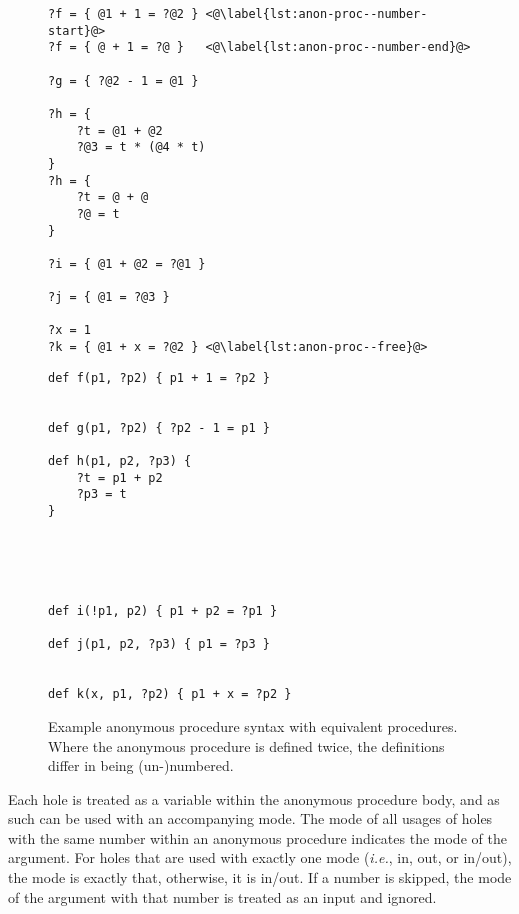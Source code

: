 \begin{figure}[ht]
  \centering
  \begin{minipage}[t]{.48\textwidth}
    \begin{lstlisting}
?f = { @1 + 1 = ?@2 } <@\label{lst:anon-proc--number-start}@>
?f = { @ + 1 = ?@ }   <@\label{lst:anon-proc--number-end}@>

?g = { ?@2 - 1 = @1 }

?h = { 
    ?t = @1 + @2
    ?@3 = t * (@4 * t)
}
?h = { 
    ?t = @ + @
    ?@ = t
}

?i = { @1 + @2 = ?@1 }

?j = { @1 = ?@3 }

?x = 1
?k = { @1 + x = ?@2 } <@\label{lst:anon-proc--free}@>
\end{lstlisting}
  \end{minipage}\hfill
  \begin{minipage}[t]{.48\textwidth}
    \begin{lstlisting}[numbers=none]
def f(p1, ?p2) { p1 + 1 = ?p2 } 


def g(p1, ?p2) { ?p2 - 1 = p1 }

def h(p1, p2, ?p3) { 
    ?t = p1 + p2
    ?p3 = t
}





def i(!p1, p2) { p1 + p2 = ?p1 }

def j(p1, p2, ?p3) { p1 = ?p3 }


def k(x, p1, ?p2) { p1 + x = ?p2 }
\end{lstlisting}
  \end{minipage}
  \caption[Example anonymous procedure syntax with equivalent procedures.]{Example anonymous procedure syntax with equivalent procedures. Where the anonymous procedure is defined twice, the definitions differ in being (un-)numbered.}
  \label{lst:anon-proc}
\end{figure}

Each hole is treated as a variable within the anonymous procedure body, and as such can be used with an accompanying mode. The mode of all usages of holes with the same number within an anonymous procedure indicates the mode of the argument. For holes that are used with exactly one mode (\textit{i.e.}, in, out, or in/out), the mode is exactly that, otherwise, it is in/out. If a number is skipped, the mode of the argument with that number is treated as an input and ignored.


